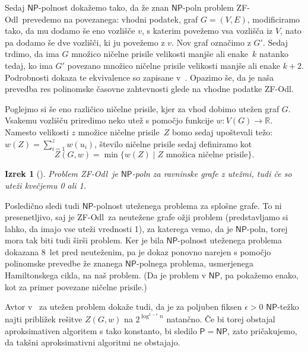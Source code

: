 \documentclass[12pt,a4paper,twoside]{article}
\theoremstyle{definition} %
\theoremstyle{plain} %
\newtheorem{izrek}[definicija]{Izrek}
\numberwithin{equation}{section}  %
\newcommand{\R}{\mathbb R}
\renewcommand{\P}{\ensuremath{\mathsf{P}}}
\newcommand{\NP}{\ensuremath{\mathsf{NP}}}
\newcommand{\ZFOdl}{\textsf{ZF-Odl}}
\begin{document}
Sedaj $\NP$-polnost dokažemo tako, da že znan $\NP$-poln problem \ZFOdl\ prevedemo na povezanega: vhodni podatek, graf $G = (V,E)$, modificiramo tako, da mu dodamo še eno vozlišče $v$, s katerim povežemo vsa vozlišča iz $V$, nato pa dodamo še dve vozlišči, ki ju povežemo z $v$. Nov graf označimo z $G'$. Sedaj trdimo, da ima $G$ množico ničelne prisile velikosti manjše ali enake~$k$ natanko tedaj, ko ima $G'$ povezano množico ničelne prisile velikosti manjše ali enake $k + 2$. Podrobnosti dokaza te ekvivalence so zapisane v~\cite{brimkov2017complexity}. Opazimo še, da je naša prevedba res polinomske časovne zahtevnosti glede na vhodne podatke \ZFOdl.

Poglejmo si še eno različico ničelne prisile, kjer za vhod dobimo utežen graf $G$.
Vsakemu vozlišču priredimo neko utež s pomočjo funkcije $w\colon V(G) \rightarrow \R$. Namesto velikosti $z$ množice ničelne prisile~$Z$ bomo sedaj upoštevali težo: $w(Z) = \sum_{i=1}^{z} w(u_i)$, število ničelne prisile sedaj definiramo kot
\[ Z(G, w) = \min\{ w(Z) \mid Z \text{ množica ničelne prisile} \} .\]

\begin{izrek}[\cite{aazami2008hardness}]
    Problem \ZFOdl\ je $\NP$-poln za ravninske grafe z utežmi, tudi če so uteži kvečjemu 0 ali 1.
\end{izrek}
Posledično sledi tudi $\NP$-polnost uteženega problema za splošne grafe. To ni presenetljivo, saj je \ZFOdl\ za neutežene grafe ožji problem (predstavljamo si lahko, da imajo vse uteži vrednosti 1), za katerega vemo, da je $\NP$-poln, torej mora tak biti tudi širši problem. Ker je bila $\NP$-polnost uteženega problema dokazana 8~let pred neuteženim, pa je dokaz ponovno narejen s pomočjo polinomske prevedbe že znanega $\NP$-polnega problema, usmerjenega Hamiltonskega cikla, na naš problem. (Da je problem v $\NP$, pa pokažemo enako, kot za primer povezane ničelne prisile.)

Avtor v~\cite[izrek~2.3.8]{aazami2008hardness} za utežen problem dokaže tudi, da je za poljuben fiksen $\epsilon > 0$ $\NP$-težko najti približek rešitve $Z(G,w)$ na $2^{\log^{1-\epsilon}n}$ natančno. Če bi torej obstajal aproksimativen algoritem s tako konstanto, bi sledilo $\P = \NP$, zato pričakujemo, da takšni aproksimativni algoritmi ne obstajajo.

\end{document}
